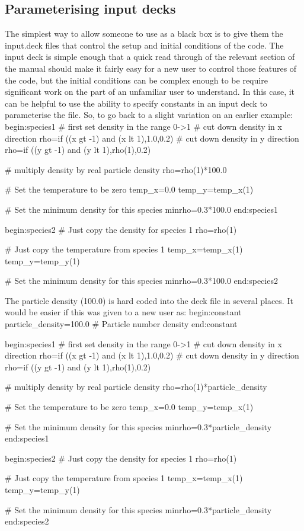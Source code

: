 \documentclass[12pt,a4paper]{article}
\newcommand{\EPOCH}{{\color{warwickdark}\fontfamily{phv}\selectfont{EPOCH}}}
\newenvironment{boxverbatim}{\lboxverbatim{none}}{\endlboxverbatim}
\begin{document}
\subsection{Parameterising input decks}
The simplest way to allow someone to use {\EPOCH} as a black box is to give them
the input.deck files that control the setup and initial conditions
of the code. The input deck is simple enough that a quick read through of the
relevant section of the manual should make it fairly easy for a new user to
control those features of the code, but the initial conditions can be complex
enough to be require significant work on the part of an unfamiliar user to
understand. In this case, it can be helpful to use the ability to specify
constants in an input deck to parameterise the file. So, to go back to a slight
variation on an earlier example:
\begin{boxverbatim}
begin:species1
   # first set density in the range 0->1
   # cut down density in x direction
   rho=if ((x gt -1) and (x lt 1),1.0,0.2)
   # cut down density in y direction
   rho=if ((y gt -1) and (y lt 1),rho(1),0.2)

   # multiply density by real particle density
   rho=rho(1)*100.0

   # Set the temperature to be zero
   temp_x=0.0
   temp_y=temp_x(1)

   # Set the minimum density for this species
   minrho=0.3*100.0
end:species1

begin:species2
   # Just copy the density for species 1
   rho=rho(1)

   # Just copy the temperature from species 1
   temp_x=temp_x(1)
   temp_y=temp_y(1)

   # Set the minimum density for this species
   minrho=0.3*100.0
end:species2
\end{boxverbatim}

The particle density (100.0) is hard coded into the deck file in several
places. It would be easier if this was given to a new user as:
\begin{boxverbatim}
begin:constant
   particle_density=100.0 # Particle number density
end:constant

begin:species1
   # first set density in the range 0->1
   # cut down density in x direction
   rho=if ((x gt -1) and (x lt 1),1.0,0.2)
   # cut down density in y direction
   rho=if ((y gt -1) and (y lt 1),rho(1),0.2)

   # multiply density by real particle density
   rho=rho(1)*particle_density

   # Set the temperature to be zero
   temp_x=0.0
   temp_y=temp_x(1)

   # Set the minimum density for this species
   minrho=0.3*particle_density
end:species1

begin:species2
   # Just copy the density for species 1
   rho=rho(1)

   # Just copy the temperature from species 1
   temp_x=temp_x(1)
   temp_y=temp_y(1)

   # Set the minimum density for this species
   minrho=0.3*particle_density
end:species2
\end{boxverbatim}
\end{document}
